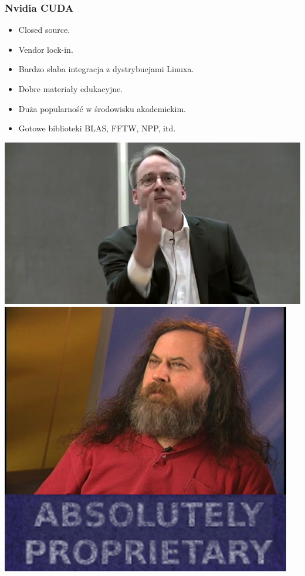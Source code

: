 \documentclass[dvipsnames,table]{beamer}
\begin{document}
\begin{frame}
	\frametitle{Nvidia CUDA}
\begin{itemize}
	\item Closed source.
	\item Vendor lock-in.
	\item Bardzo słaba integracja z dystrybucjami Linuxa.
	\item Dobre materiały edukacyjne.
	\item Duża popularność w środowisku akademickim.
	\item Gotowe biblioteki BLAS, FFTW, NPP, itd.
\end{itemize}
\includegraphics[scale=0.25]{img-torvalds.png}
\includegraphics[scale=0.19]{img-stallman.jpg}

\end{frame}
\end{document}
